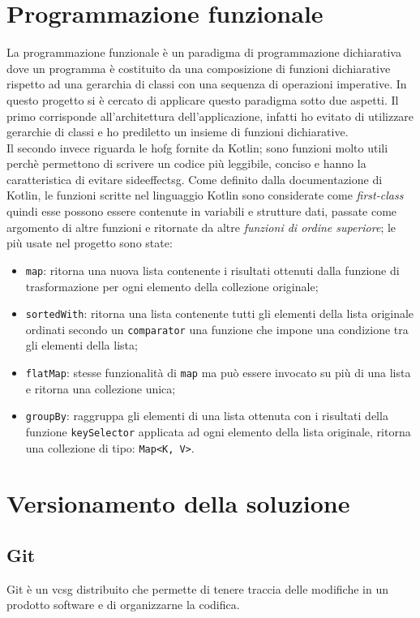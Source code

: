 \section{Programmazione funzionale}
La programmazione funzionale è un paradigma di programmazione dichiarativa dove un programma è costituito da una composizione di funzioni dichiarative rispetto ad una gerarchia di classi con una sequenza di operazioni imperative. In questo progetto si è cercato di applicare questo paradigma sotto due aspetti. Il primo corrisponde all'architettura dell'applicazione, infatti ho evitato di utilizzare gerarchie di classi e ho prediletto un insieme di funzioni dichiarative. \\
Il secondo invece riguarda le \gls{hofg} fornite da Kotlin; sono funzioni molto utili perchè permettono di scrivere un codice più leggibile, conciso e hanno la caratteristica di evitare \gls{sideeffectsg}. Come definito dalla documentazione di Kotlin, le funzioni scritte nel linguaggio Kotlin sono considerate come \emph{first-class} quindi esse possono essere contenute in variabili e strutture dati, passate come argomento di altre funzioni e ritornate da altre \emph{funzioni di ordine superiore}; le più usate nel progetto sono state:
\begin{itemize}
	\item \verb|map|: ritorna una nuova lista contenente i risultati ottenuti dalla funzione di trasformazione per ogni elemento della collezione originale;
	\item \verb|sortedWith|: ritorna una lista contenente tutti gli elementi della lista originale ordinati secondo un \verb|comparator| una funzione che impone una condizione tra gli elementi della lista;
	\item \verb|flatMap|: stesse funzionalità di \verb|map| ma può essere invocato su più di una lista e ritorna una collezione unica;
	\item \verb|groupBy|: raggruppa gli elementi di una lista ottenuta con i risultati della funzione \verb|keySelector| applicata ad ogni elemento della lista originale, ritorna una collezione di tipo: \verb|Map<K, V>|.
\end{itemize}

\section{Versionamento della soluzione}
\subsection{Git}
Git è un \gls{vcsg} distribuito che permette di tenere traccia delle modifiche in un prodotto software e di organizzarne la codifica. 

